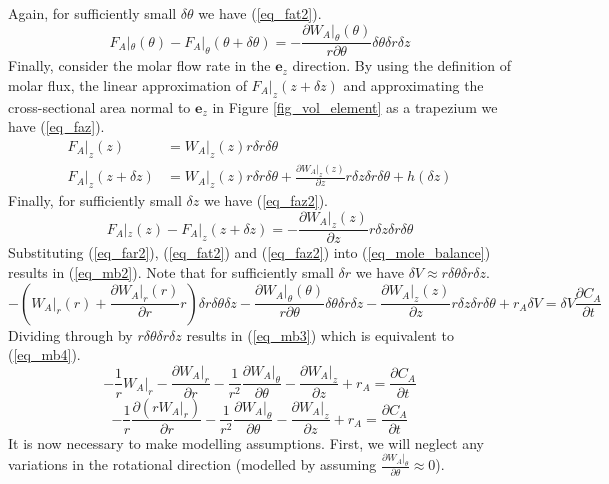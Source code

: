 \documentclass[11pt,fleqn]{article}
\theoremstyle{defstyle}
\begin{document}
Again, for sufficiently small $\delta \theta$ we have (\ref{eq_fat2}).
\begin{equation}
F_A|_\theta(\theta) - F_A|_\theta(\theta + \delta \theta) =- \frac{\partial W_A|_\theta(\theta)}{r \partial \theta}\delta \theta\delta r \delta z
\label{eq_fat2} 
\end{equation}
Finally, consider the molar flow rate in the $\mathbf{e}_z$ direction. By using the definition of molar flux, the linear approximation of $F_A|_z(z+\delta z)$ and approximating the cross-sectional area normal to $\mathbf{e}_z$ in Figure \ref{fig_vol_element} as a trapezium we have (\ref{eq_faz}).
\begin{equation}
\begin{aligned}
F_A|_z(z) &= W_A|_z(z) r \delta r \delta \theta \\
F_A|_z(z + \delta z) &= W_A|_z(z) r \delta r \delta \theta + \frac{\partial W_A|_z(z)}{\partial z}r \delta z \delta r \delta \theta + h(\delta z)
\end{aligned}
\label{eq_faz}
\end{equation}
Finally, for sufficiently small $\delta z$ we have (\ref{eq_faz2}).
\begin{equation}
F_A|_z(z) - F_A|_z(z + \delta z) = - \frac{\partial W_A|_z(z)}{\partial z}r \delta z \delta r \delta \theta
\label{eq_faz2}
\end{equation}
Substituting (\ref{eq_far2}), (\ref{eq_fat2}) and (\ref{eq_faz2}) into (\ref{eq_mole_balance}) results in (\ref{eq_mb2}). Note that for sufficiently small $\delta r$ we have $\delta V \approx r \delta \theta \delta r \delta z$.
\begin{equation}
- \left(W_ A|_r(r)  + \frac{\partial W_A|_r(r)}{\partial r}r\right) \delta r \delta \theta \delta z - \frac{\partial W_A|_\theta(\theta)}{r \partial \theta}\delta \theta\delta r \delta z - \frac{\partial W_A|_z(z)}{\partial z}r \delta z \delta r \delta \theta + r_A \delta V = \delta V \frac{\partial C_A}{\partial t}
\label{eq_mb2}
\end{equation}
Dividing through by $r \delta \theta \delta r \delta z$ results in (\ref{eq_mb3}) which is equivalent to (\ref{eq_mb4}).
\begin{equation}
-\frac{1}{r} W_A|_r - \frac{\partial W_A|_r}{\partial r} - \frac{1}{r^2}\frac{\partial W_A|_\theta}{\partial \theta} - \frac{\partial W_A|_z}{\partial z}+ r_A  = \frac{\partial C_A}{\partial t}
\label{eq_mb3}
\end{equation}
\begin{equation}
-\frac{1}{r} \frac{\partial (rW_A|_r)}{\partial r} - \frac{1}{r^2}\frac{\partial W_A|_\theta}{\partial \theta} - \frac{\partial W_A|_z}{\partial z}+ r_A  = \frac{\partial C_A}{\partial t}
\label{eq_mb4}
\end{equation}
It is now necessary to make modelling assumptions. First, we will neglect any variations in the rotational direction (modelled by assuming $\frac{\partial W_A|_\theta}{\partial \theta} \approx 0$).
\end{document}
